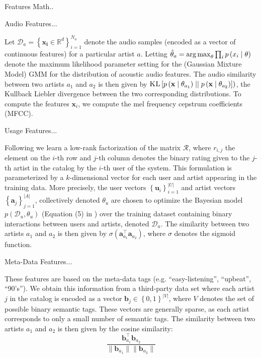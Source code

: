 Features Math..

Audio Features...

Let $\mathcal{D}_a=\left\{\mathbf{x_i} \in \mathbb{R}^d\right\}_{i=1}^{N_a}$ denote the audio samples (encoded as a vector of continuous features) for a particular artist $a$. Letting $\hat{\theta}_a=\argmax_{\theta} \prod_i p\left(x_i\mid\theta\right)$ denote the maximum likelihood parameter setting for the (Gaussian Mixture Model) GMM  for the distribution of acoustic audio features. The audio similarity between two artists $a_1$ and $a_2$ is then given by $\textsc{KL}\left[ p\left(\mathbf{x}\mid\theta_{a_1}\right) \mid \mid p\left(\mathbf{x}\mid\theta_{a_2}\right)\right
])$, the Kullback Liebler divergence between the two corresponding distributions. To compute the features $\mathbf{x}_i$, we compute the mel frequency cepstrum coefficients (MFCC).


Usage Features...

Following \cite{xbox-www} we learn a low-rank factorization of the matrix $\mathcal{R}$,
 where $r_{i,j}$ the element on the $i$-th row and $j$-th column denotes the binary rating given to the $j$-th artist in the catalog by the $i$-th user of the system. This formulation is parameterized by a $k$-dimensional vector for each user and artist appearing in the training data. More precisely, the user vectors $\left\{\mathbf{u}_i\right\}_{i=1}^{|U|}$ and artist vectors $\left\{\mathbf{a}_j\right\}_{j=1}^{|A|}$, collectively denoted $\theta_u$ are chosen to optimize the Bayesian model $p(\mathcal{D}_u,\theta_u)$ (Equation (5) in \cite{xbox-www}) over the training dataset containing binary interactions between users and artists, denoted $\mathcal{D}_u$.  The similarity between two artists $a_1$ and $a_2$ is then given by $\sigma \left(\mathbf{a}_{a_1}^\top\mathbf{a}_{a_2}\right)$, where $\sigma$ denotes the sigmoid function.
 
Meta-Data Features...

These features are based on the meta-data tags (e.g. ``easy-listening'', ``upbeat'', ``90's'').
We obtain this information from a third-party data set where each artist $j$ in the catalog is  encoded as a vector $\mathbf{b}_j \in \left\{0,1\right\}^{|V|}$, where $V$ denotes the set of  possible binary semantic tags. These vectors are generally sparse, as each artist corresponds to only a small number of semantic tags.  The similarity between two artists $a_1$ and $a_2$ is then given by the cosine similarity: 
$$\frac{\mathbf{b}_{a_1}^\top\mathbf{b}_{a_2}}{\parallel\mathbf{b}_{a_1}\parallel\parallel\mathbf{b}_{a_2}\parallel}$$

